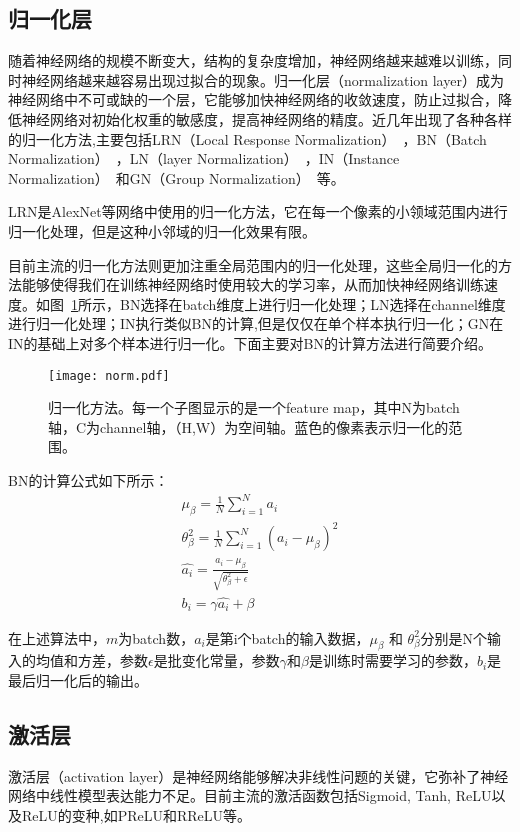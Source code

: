\subsection{归一化层}


随着神经网络的规模不断变大，结构的复杂度增加，神经网络越来越难以训练，同时神经网络越来越容易出现过拟合的现象。归一化层（normalization layer）成为神经网络中不可或缺的一个层，它能够加快神经网络的收敛速度，防止过拟合，降低神经网络对初始化权重的敏感度，提高神经网络的精度。近几年出现了各种各样的归一化方法,主要包括LRN（Local Response Normalization）~\cite{krizhevsky2012imagenet}，BN（Batch Normalization）~\cite{ioffe2015batch}，LN（layer Normalization）~\cite{ba2016layer}，IN（Instance Normalization）~\cite{dmitry2016instance}和GN（Group Normalization）~\cite{wu2018group}等。

LRN是AlexNet等网络中使用的归一化方法，它在每一个像素的小领域范围内进行归一化处理，但是这种小邻域的归一化效果有限。

目前主流的归一化方法则更加注重全局范围内的归一化处理，这些全局归一化的方法能够使得我们在训练神经网络时使用较大的学习率，从而加快神经网络训练速度。如图~\ref{fig:norm}所示，BN选择在batch维度上进行归一化处理；LN选择在channel维度进行归一化处理；IN执行类似BN的计算,但是仅仅在单个样本执行归一化；GN在IN的基础上对多个样本进行归一化。下面主要对BN的计算方法进行简要介绍。

\begin{figure}[h]
  \centering
  \texttt{[image: norm.pdf]}
  \caption{\footnotesize 归一化方法。每一个子图显示的是一个feature map，其中N为batch轴，C为channel轴，（H,W）为空间轴。蓝色的像素表示归一化的范围。}
  \label{fig:norm}
\end{figure}

BN的计算公式如下所示：
\begin{gather}
\mu _{\beta} = \frac{1}{N} \sum_{i=1}^{N} a_i \\
\theta _{\beta}^{2} = \frac{1}{N} \sum_{i=1}^{N}(a_i - \mu _{\beta})^{2} \\
\hat{a_i}=\frac{a_i - \mu _{\beta}}{\sqrt{\theta _{\beta}^2 + \epsilon}} \\
b_i = \gamma \hat{a_i} + \beta
\end{gather}

在上述算法中，$m$为batch数，$a_i$是第i个batch的输入数据，$\mu _{\beta}$ 和 $\theta _{\beta}^{2}$分别是N个输入的均值和方差，参数$\epsilon$是批变化常量，参数$\gamma$和$\beta$是训练时需要学习的参数，$b_i$是最后归一化后的输出。

\subsection{激活层}
激活层（activation layer）是神经网络能够解决非线性问题的关键，它弥补了神经网络中线性模型表达能力不足。目前主流的激活函数包括Sigmoid, Tanh, ReLU以及ReLU的变种,如PReLU和RReLU等。

